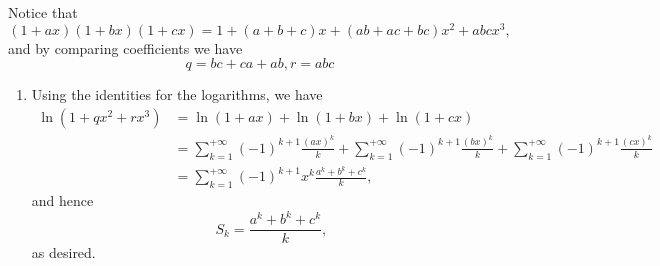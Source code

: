 \Question{\currfilebase}

Notice that
\[
    (1+ax)(1+bx)(1+cx) = 1 + (a + b + c) x + (ab + ac + bc) x^2 + abc x^3,
\]
and by comparing coefficients we have
\[
    q = bc + ca + ab, r = abc
\]

\begin{enumerate}
    \item Using the identities for the logarithms, we have
          \begin{align*}
              \ln(1 + qx^2 + rx^3) & = \ln(1 + ax) + \ln(1 + bx) + \ln(1 + cx)                                                                                                                            \\
                                   & = \sum_{k = 1}^{+\infty} (-1)^{k + 1} \frac{(ax)^k}{k} + \sum_{k = 1}^{+\infty} (-1)^{k + 1} \frac{(bx)^k}{k} + \sum_{k = 1}^{+\infty} (-1)^{k + 1} \frac{(cx)^k}{k} \\
                                   & = \sum_{k = 1}^{+\infty} (-1)^{k + 1} x^k \frac{a^k + b^k + c^k}{k},
          \end{align*}
          and hence
          \[
              S_k = \frac{a^k + b^k + c^k}{k},
          \]
          as desired.


\end{enumerate}
